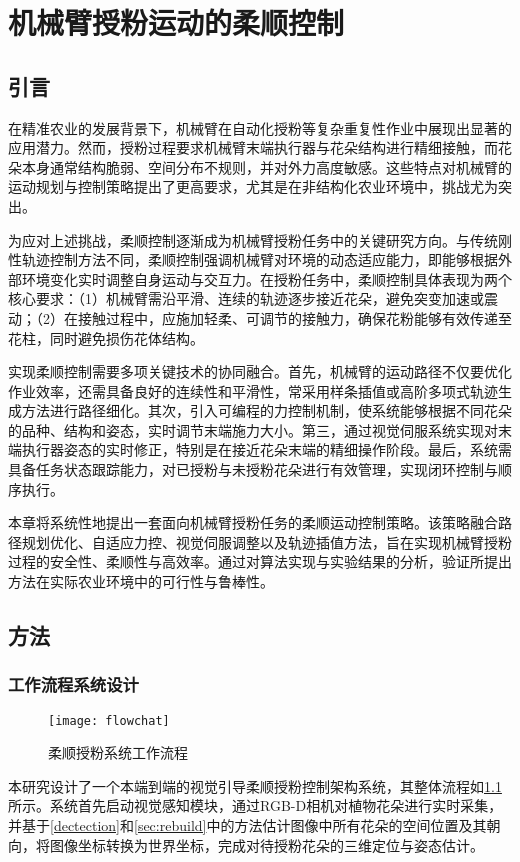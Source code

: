 
\chapter{机械臂授粉运动的柔顺控制}\label{ch:5}
\section{引言}
在精准农业的发展背景下，机械臂在自动化授粉等复杂重复性作业中展现出显著的应用潜力。然而，授粉过程要求机械臂末端执行器与花朵结构进行精细接触，而花朵本身通常结构脆弱、空间分布不规则，并对外力高度敏感。这些特点对机械臂的运动规划与控制策略提出了更高要求，尤其是在非结构化农业环境中，挑战尤为突出。

为应对上述挑战，柔顺控制逐渐成为机械臂授粉任务中的关键研究方向。与传统刚性轨迹控制方法不同，柔顺控制强调机械臂对环境的动态适应能力，即能够根据外部环境变化实时调整自身运动与交互力。在授粉任务中，柔顺控制具体表现为两个核心要求：（1）机械臂需沿平滑、连续的轨迹逐步接近花朵，避免突变加速或震动；（2）在接触过程中，应施加轻柔、可调节的接触力，确保花粉能够有效传递至花柱，同时避免损伤花体结构。

实现柔顺控制需要多项关键技术的协同融合。首先，机械臂的运动路径不仅要优化作业效率，还需具备良好的连续性和平滑性，常采用样条插值或高阶多项式轨迹生成方法进行路径细化。其次，引入可编程的力控制机制，使系统能够根据不同花朵的品种、结构和姿态，实时调节末端施力大小。第三，通过视觉伺服系统实现对末端执行器姿态的实时修正，特别是在接近花朵末端的精细操作阶段。最后，系统需具备任务状态跟踪能力，对已授粉与未授粉花朵进行有效管理，实现闭环控制与顺序执行。

本章将系统性地提出一套面向机械臂授粉任务的柔顺运动控制策略。该策略融合路径规划优化、自适应力控、视觉伺服调整以及轨迹插值方法，旨在实现机械臂授粉过程的安全性、柔顺性与高效率。通过对算法实现与实验结果的分析，验证所提出方法在实际农业环境中的可行性与鲁棒性。

\section{方法}
\subsection{工作流程系统设计}
\begin{figure}[htb]
	\texttt{[image: flowchat]}
	\caption[柔顺授粉系统工作流程]{柔顺授粉系统工作流程} %
	\label{fig:flowchat}
\end{figure}
本研究设计了一个本端到端的视觉引导柔顺授粉控制架构系统，其整体流程如\cref{fig:flowchat}所示。系统首先启动视觉感知模块，通过RGB-D相机对植物花朵进行实时采集，并基于\ref{dectection}和\ref{sec:rebuild}中的方法估计图像中所有花朵的空间位置及其朝向，将图像坐标转换为世界坐标，完成对待授粉花朵的三维定位与姿态估计。

